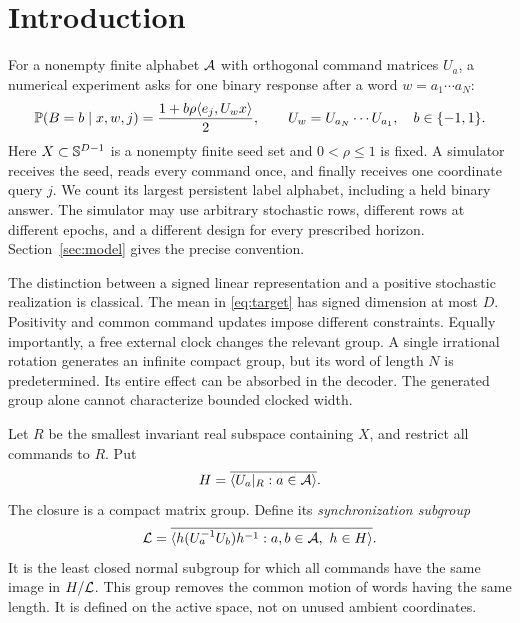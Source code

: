\section{Introduction}
For a nonempty finite alphabet $\mathcal A$ with orthogonal command matrices $U_a$, a numerical experiment asks for one binary response after a word $w=a_1\cdots a_N$:
\begin{equation}\label{eq:target}
 \mathbb P(B=b\mid x,w,j)=\frac{1+b\rho\langle e_j,U_wx\rangle}2,
 \qquad U_w=U_{a_N}\cdots U_{a_1},\quad b\in\{-1,1\}.
\end{equation}
Here $X\subset\mathbb S^{D-1}$ is a nonempty finite seed set and $0<\rho\le1$ is fixed. A simulator receives the seed, reads every command once, and finally receives one coordinate query $j$. We count its largest persistent label alphabet, including a held binary answer. The simulator may use arbitrary stochastic rows, different rows at different epochs, and a different design for every prescribed horizon. Section~\ref{sec:model} gives the precise convention.

The distinction between a signed linear representation and a positive stochastic realization is classical. The mean in \eqref{eq:target} has signed dimension at most $D$. Positivity and common command updates impose different constraints. Equally importantly, a free external clock changes the relevant group. A single irrational rotation generates an infinite compact group, but its word of length $N$ is predetermined. Its entire effect can be absorbed in the decoder. The generated group alone cannot characterize bounded clocked width.

Let $R$ be the smallest invariant real subspace containing $X$, and restrict all commands to $R$. Put
\[
 H=\overline{\langle U_a|_R:a\in\mathcal A\rangle}.
\]
The closure is a compact matrix group. Define its \emph{synchronization subgroup}
\begin{equation}\label{eq:sync-intro}
 \mathcal L=\overline{\langle h(U_a^{-1}U_b)h^{-1}:a,b\in\mathcal A,\ h\in H\rangle}.
\end{equation}
It is the least closed normal subgroup for which all commands have the same image in $H/\mathcal L$. This group removes the common motion of words having the same length. It is defined on the active space, not on unused ambient coordinates.

